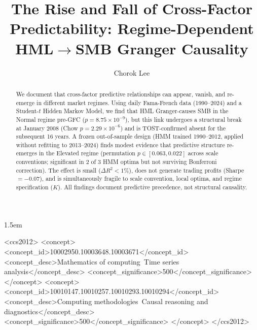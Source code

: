 \documentclass[sigconf,anonymous]{acmart}
\begin{document}
\sloppy
\emergencystretch 1.5em

\title{The Rise and Fall of Cross-Factor Predictability: Regime-Dependent HML$\to$SMB Granger Causality}

\author{Chorok Lee}

\begin{abstract}
We document that cross-factor predictive relationships can appear, vanish, and
re-emerge in different market regimes.
Using daily Fama-French data (1990--2024) and a Student-$t$ Hidden Markov Model,
we find that HML Granger-causes SMB in the Normal regime pre-GFC
($p = 8.75 \times 10^{-9}$), but this link undergoes a structural break at
January 2008 (Chow $p = 2.29\times10^{-6}$) and is TOST-confirmed absent
for the subsequent 16 years.
A frozen out-of-sample design (HMM trained 1990--2012, applied without refitting
to 2013--2024) finds modest evidence that predictive structure re-emerges
in the Elevated regime (permutation $p \in [0.063, 0.022]$ across scale
conventions; significant in 2 of 3 HMM optima but not surviving Bonferroni
correction).
The effect is small ($\Delta R^2 < 1\%$), does not generate trading profits
(Sharpe $= -0.07$), and is simultaneously fragile to scale convention, local
optima, and regime specification ($K$).
All findings document predictive precedence, not structural causality.
\end{abstract}

\begin{CCSXML}
<ccs2012>
   <concept>
       <concept_id>10002950.10003648.10003671</concept_id>
       <concept_desc>Mathematics of computing~Time series analysis</concept_desc>
       <concept_significance>500</concept_significance>
   </concept>
   <concept>
       <concept_id>10010147.10010257.10010293.10010294</concept_id>
       <concept_desc>Computing methodologies~Causal reasoning and diagnostics</concept_desc>
       <concept_significance>500</concept_significance>
   </concept>
</ccs2012>
\end{CCSXML}


\end{document}
